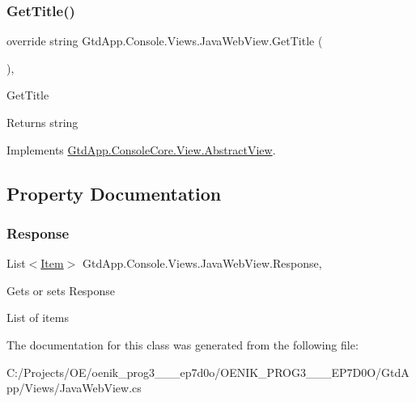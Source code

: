 \subsubsection{\texorpdfstring{Get\+Title()}{GetTitle()}}
{\footnotesize\ttfamily override string Gtd\+App.\+Console.\+Views.\+Java\+Web\+View.\+Get\+Title (\begin{DoxyParamCaption}{ }\end{DoxyParamCaption})\hspace{0.3cm}{\ttfamily [protected]}, {\ttfamily [virtual]}}



Get\+Title 

\begin{DoxyReturn}{Returns}
string
\end{DoxyReturn}


Implements \mbox{\hyperlink{class_gtd_app_1_1_console_core_1_1_view_1_1_abstract_view_ada76ebf03434f22dbd103a09f292ff7c}{Gtd\+App.\+Console\+Core.\+View.\+Abstract\+View}}.



\subsection{Property Documentation}
\mbox{\label{class_gtd_app_1_1_console_1_1_views_1_1_java_web_view_a5c8f9afd066cd29d616c51712eb2c6c1}} 
\subsubsection{\texorpdfstring{Response}{Response}}
{\footnotesize\ttfamily List$<$\mbox{\hyperlink{class_gtd_app_1_1_data_1_1_item}{Item}}$>$ Gtd\+App.\+Console.\+Views.\+Java\+Web\+View.\+Response\hspace{0.3cm}{\ttfamily [get]}, {\ttfamily [set]}}



Gets or sets Response 

List of items

The documentation for this class was generated from the following file\+:\begin{DoxyCompactItemize}
\item 
C\+:/\+Projects/\+O\+E/oenik\+\_\+prog3\+\_\+\_\+\_\+ep7d0o/\+O\+E\+N\+I\+K\+\_\+\+P\+R\+O\+G3\+\_\+\_\+\_\+\+E\+P7\+D0\+O/\+Gtd\+App/\+Views/Java\+Web\+View.\+cs\end{DoxyCompactItemize}
